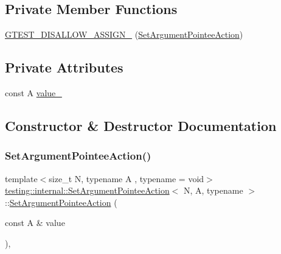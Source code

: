 \subsection*{Private Member Functions}
\begin{DoxyCompactItemize}
\item 
\mbox{\hyperlink{structtesting_1_1internal_1_1_set_argument_pointee_action_a1672d3c82dba802eecaa9c581935f10b}{G\+T\+E\+S\+T\+\_\+\+D\+I\+S\+A\+L\+L\+O\+W\+\_\+\+A\+S\+S\+I\+G\+N\+\_\+}} (\mbox{\hyperlink{structtesting_1_1internal_1_1_set_argument_pointee_action}{Set\+Argument\+Pointee\+Action}})
\end{DoxyCompactItemize}
\subsection*{Private Attributes}
\begin{DoxyCompactItemize}
\item 
const A \mbox{\hyperlink{structtesting_1_1internal_1_1_set_argument_pointee_action_a15e2027e9cfaac539a9db12f766188ab}{value\+\_\+}}
\end{DoxyCompactItemize}


\subsection{Constructor \& Destructor Documentation}
\mbox{\label{structtesting_1_1internal_1_1_set_argument_pointee_action_a2432930a863ed840d2ca6a203972ab0a}} 
\subsubsection{\texorpdfstring{SetArgumentPointeeAction()}{SetArgumentPointeeAction()}}
{\footnotesize\ttfamily template$<$size\+\_\+t N, typename A , typename  = void$>$ \\
\mbox{\hyperlink{structtesting_1_1internal_1_1_set_argument_pointee_action}{testing\+::internal\+::\+Set\+Argument\+Pointee\+Action}}$<$ N, A, typename $>$\+::\mbox{\hyperlink{structtesting_1_1internal_1_1_set_argument_pointee_action}{Set\+Argument\+Pointee\+Action}} (\begin{DoxyParamCaption}\item[{const A \&}]{value }\end{DoxyParamCaption})\hspace{0.3cm}{\ttfamily [inline]}, {\ttfamily [explicit]}}



